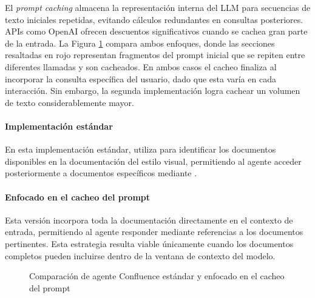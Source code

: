 El \textit{prompt caching} almacena la representación interna del LLM para secuencias de texto iniciales repetidas, evitando cálculos redundantes en consultas posteriores. APIs como OpenAI ofrecen descuentos significativos cuando se cachea gran parte de la entrada. La Figura \ref{fig:caching} compara ambos enfoques, donde las secciones resaltadas en rojo representan fragmentos del prompt inicial que se repiten entre diferentes llamadas y son cacheados. En ambos casos el cacheo finaliza al incorporar la consulta específica del usuario, dado que esta varía en cada interacción. Sin embargo, la segunda implementación logra cachear un volumen de texto considerablemente mayor.
\paragraph{Implementación estándar}
En esta implementación estándar,  utiliza  para identificar los documentos disponibles en la documentación del estilo visual, permitiendo al agente acceder posteriormente a documentos específicos mediante .
\paragraph{Enfocado en el cacheo del prompt}
Esta versión incorpora toda la documentación directamente en el contexto de entrada, permitiendo al agente responder mediante referencias a los documentos pertinentes. Esta estrategia resulta viable únicamente cuando los documentos completos pueden incluirse dentro de la ventana de contexto del modelo.

\begin{figure}[h]
  \centering
  \caption{Comparación de agente Confluence estándar y enfocado en el cacheo del prompt}
  \label{fig:caching}
\end{figure}

